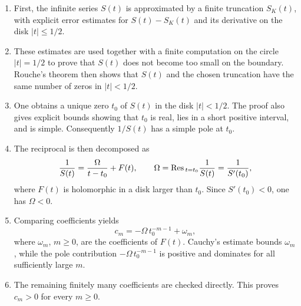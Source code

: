 \documentclass[11pt,reqno]{amsart}
\theoremstyle{plain}
\theoremstyle{remark}
\theoremstyle{definition}
\numberwithin{equation}{section}
\def\func#1{\mathop{\rm #1}}%
\newcommand{\hilfsftn}{F}
\newcommand{\residuum}{\Omega }
\newcommand{\zerlegung}{K}
\begin{document}
\begin{enumerate}[label=\textup{(\arabic*)}, leftmargin=2.2em]
  \item First, the infinite series $S(t)$ is approximated by a finite truncation $S_{\zerlegung }\left( t\right)
  $, with explicit error estimates for $S(t)-S_{\zerlegung }\left( t\right)
  $ and its derivative on the disk $|t|\leq 1/2$.

  \item These estimates are used together with a finite computation on the circle $|t|=1/2$ to prove that $S(t)$ does not become too small on the boundary. Rouche's theorem then shows that $S(t)$ and the chosen truncation have the same number of zeros in $|t|<1/2$.

  \item One obtains a unique zero $t_0$ of $S(t)$ in the disk $|t|<1/2$. The proof also gives explicit bounds showing that $t_0$ is real, lies in a short positive interval, and is simple. Consequently $1/S(t)$ has a simple pole at $t_0$.

  \item The reciprocal is then decomposed as
  \[
    \frac{1}{S(t)}=\frac{\residuum }{t-t_0}+\hilfsftn (t),
    \qquad
    \residuum =\func{Res}{}_{t=t_0}\frac{1}{S(t)}=\frac{1}{S'(t_0)},
  \]
  where $\hilfsftn (t)$ is holomorphic in a disk larger than $
t_{0}$. Since $S'(t_0)<0$, one has $\residuum <0$.

  \item Comparing coefficients yields
  \[
    c_m = -\residuum \, t_0^{-m-1} + \omega _m,
  \]
  where $\omega _m$, $m\geq 0$, are
  the coefficients of $\hilfsftn (t)$. Cauchy's estimate bounds $\omega _m$, while the pole contribution $-\residuum \,t_0^{-m-1}$ is positive and dominates for all sufficiently large $m$.

  \item The remaining finitely many coefficients are checked directly. This proves $c_m>0$ for every $m\geq 0$.
\end{enumerate}
\end{document}
